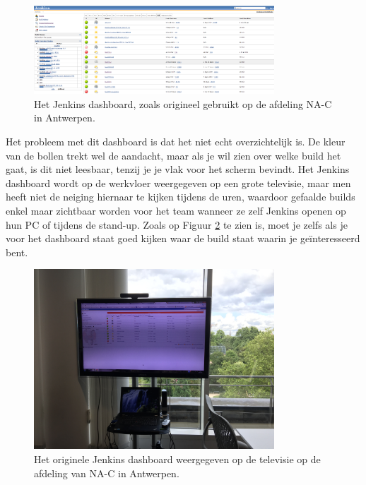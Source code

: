 \documentclass[10pt,a4paper]{article}
\begin{document}
\begin{figure}[ht!]
\centering
\includegraphics[width=90mm]{CaptureJenkins.png}
\caption{Het Jenkins dashboard, zoals origineel gebruikt op de afdeling NA-C in Antwerpen.} 
\label{jenkins}
\end{figure}

Het probleem met dit dashboard is dat het niet echt overzichtelijk is. De kleur van de bollen trekt wel de aandacht, maar als je wil zien over welke build het gaat, is dit niet leesbaar, tenzij je je vlak voor het scherm bevindt. Het Jenkins dashboard wordt op de werkvloer weergegeven op een grote televisie, maar men heeft niet de neiging hiernaar te kijken tijdens de uren, waardoor gefaalde builds enkel maar zichtbaar worden voor het team wanneer ze zelf Jenkins openen op hun PC of tijdens de stand-up. Zoals op Figuur \ref{tv_1} te zien is, moet je zelfs als je voor het dashboard staat goed kijken waar de build staat waarin je ge\"interesseerd bent.

\begin{figure}[ht!]
\centering
\includegraphics[width=90mm]{tvdashboardoriginal.jpg}
\caption{Het originele Jenkins dashboard weergegeven op de televisie op de afdeling van NA-C in Antwerpen.} 
\label{tv_1}
\end{figure}
\end{document}
